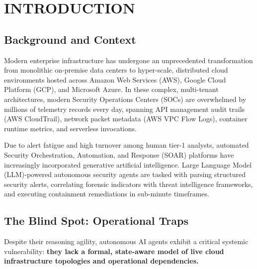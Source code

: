 \documentclass[12pt,a4paper]{report}
\begin{document}
\newpage
{}
\setcounter{page}{1}
\hypersetup{pageanchor=true}

\tableofcontents
\newpage
\listoftables
\newpage
\listoffigures
\newpage

\setcounter{page}{1}

\chapter{INTRODUCTION}

\section{Background and Context}\label{sec:background}
Modern enterprise infrastructure has undergone an unprecedented transformation from monolithic on-premise data centers to hyper-scale, distributed cloud environments hosted across Amazon Web Services (AWS), Google Cloud Platform (GCP), and Microsoft Azure. In these complex, multi-tenant architectures, modern Security Operations Centers (SOCs) are overwhelmed by millions of telemetry records every day, spanning API management audit trails (AWS CloudTrail), network packet metadata (AWS VPC Flow Logs), container runtime metrics, and serverless invocations.

Due to alert fatigue and high turnover among human tier-1 analysts, automated Security Orchestration, Automation, and Response (SOAR) platforms have increasingly incorporated generative artificial intelligence. Large Language Model (LLM)-powered autonomous security agents are tasked with parsing structured security alerts, correlating forensic indicators with threat intelligence frameworks, and executing containment remediations in sub-minute timeframes.

\section{The Blind Spot: Operational Traps}\label{sec:traps}
Despite their reasoning agility, autonomous AI agents exhibit a critical systemic vulnerability: \textbf{they lack a formal, state-aware model of live cloud infrastructure topologies and operational dependencies.}
\end{document}
